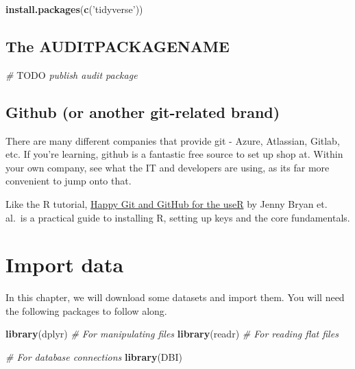 \documentclass[
]{book}
\newenvironment{Shaded}{\begin{snugshade}}{\end{snugshade}}
\newcommand{\AlertTok}[1]{\textcolor[rgb]{0.94,0.16,0.16}{#1}}
\newcommand{\CommentTok}[1]{\textcolor[rgb]{0.56,0.35,0.01}{\textit{#1}}}
\newcommand{\KeywordTok}[1]{\textcolor[rgb]{0.13,0.29,0.53}{\textbf{#1}}}
\newcommand{\NormalTok}[1]{#1}
\newcommand{\StringTok}[1]{\textcolor[rgb]{0.31,0.60,0.02}{#1}}
\begin{document}
\begin{Shaded}
\begin{Highlighting}[]
\KeywordTok{install.packages}\NormalTok{(}\KeywordTok{c}\NormalTok{(}\StringTok{'tidyverse'}\NormalTok{))}
\end{Highlighting}
\end{Shaded}

\hypertarget{the-auditpackagename}{%
\section{The AUDITPACKAGENAME}\label{the-auditpackagename}}

\begin{Shaded}
\begin{Highlighting}[]
\CommentTok{# }\AlertTok{TODO}\CommentTok{ publish audit package}
\end{Highlighting}
\end{Shaded}

\hypertarget{github-or-another-git-related-brand}{%
\section{Github (or another git-related brand)}\label{github-or-another-git-related-brand}}

There are many different companies that provide git - Azure, Atlassian, Gitlab, etc. If you're learning, github is a fantastic free source to set up shop at. Within your own company, see what the IT and developers are using, as its far more convenient to jump onto that.

Like the R tutorial, \href{https://happygitwithr.com}{Happy Git and GitHub for the useR} by Jenny Bryan et. al.~is a practical guide to installing R, setting up keys and the core fundamentals.

\hypertarget{import-data}{%
\chapter{Import data}\label{import-data}}

In this chapter, we will download some datasets and import them. You will need the following packages to follow along.

\begin{Shaded}
\begin{Highlighting}[]
\KeywordTok{library}\NormalTok{(dplyr) }\CommentTok{# For manipulating files}
\KeywordTok{library}\NormalTok{(readr) }\CommentTok{# For reading flat files}

 \CommentTok{# For database connections}
\KeywordTok{library}\NormalTok{(DBI)}
\end{Highlighting}
\end{Shaded}
\end{document}
